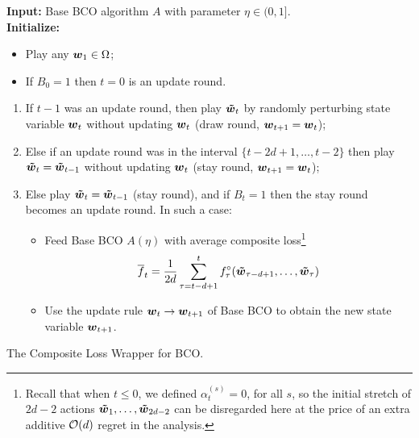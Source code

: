\begin{algorithm2e}[t]
 
\textbf{Input:} Base BCO algorithm $A$ with parameter $\eta \in (0,1]$.\\%
\textbf{Initialize:}
\begin{itemize}[topsep=0pt,parsep=0pt,itemsep=0pt]
\item Play any $\boldsymbol{w}_1 \in \Omega$;
\item If $B_0 = 1$ then $t=0$ is an update round.
\end{itemize}
%
 { {
\begin{enumerate}[topsep=0pt,parsep=0pt,itemsep=0pt]
\item If $t-1$ was an update round, then play $\boldsymbol{{\tilde w}}_t$ by randomly perturbing state variable $\boldsymbol{w}_t$ without updating $\boldsymbol{w}_t$ (draw round, $\boldsymbol{w}_{t+1} = \boldsymbol{w}_t$);
\item Else if an update round was in the interval $\{t-2d+1, \dots,t-2\}$ then play $\boldsymbol{{\tilde w}}_t = \boldsymbol{{\tilde w}}_{t-1}$ without updating $\boldsymbol{w}_t$
(stay round, $\boldsymbol{w}_{t+1} = \boldsymbol{w}_t$);
\item Else play $\boldsymbol{{\tilde w}}_t = \boldsymbol{{\tilde w}}_{t-1}$ (stay round), and if $B_t=1$ then the stay round becomes an update round. In such a case:
%
\begin{minipage}{\textwidth-50pt}
\begin{itemize}[topsep=0pt,parsep=0pt,itemsep=0pt]
\vspace{0.05in}
\item Feed Base BCO $A(\eta)$ with average composite loss\footnote
{
Recall that when $t \leq 0$, we defined $\alpha^{(s)}_{t} =0$, for all $s$, so the initial stretch of $2d-2$ actions $\boldsymbol{{\tilde w}}_1,\ldots,\boldsymbol{{\tilde w}}_{2d-2}$ can be disregarded here at the price of an extra additive $\mathcal{O}(d)$ regret in the analysis.
}
%
\[
{\overline{f}}_t = \frac{1}{2d}\sum_{\tau=t-d+1}^t f^{\circ}_\tau(\boldsymbol{{\tilde w}}_{\tau-d+1},\dots,\boldsymbol{{\tilde w}}_{\tau})
\]
\item Use the update rule $\boldsymbol{w}_t\rightarrow \boldsymbol{w}_{t+1}$ of Base BCO to obtain the new state variable $\boldsymbol{w}_{t+1}$.
\end{itemize}
\end{minipage}
\end{enumerate}
} } \caption{The Composite Loss Wrapper for BCO.}
\label{a:delayed-bco}
\end{algorithm2e}

